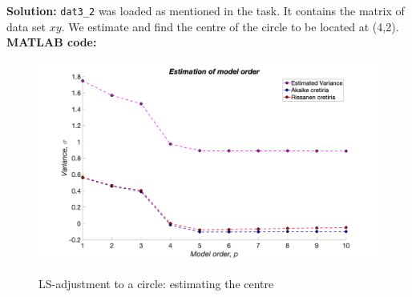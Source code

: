 \noindent \textbf{Solution:} \texttt{dat3\_2} was loaded as mentioned in the task. It contains the matrix of data set $xy.$ We estimate and find the centre of the circle to be located at (4,2).\\ 

\noindent \textbf{MATLAB code:}


\begin{figure}[H]
\centering
{\includegraphics[scale=0.15]{ass6_1.png}}
\caption{LS-adjustment to a circle: estimating the centre }
\label{LS-adjustment to a circle: estimating the centre }
\end{figure}

